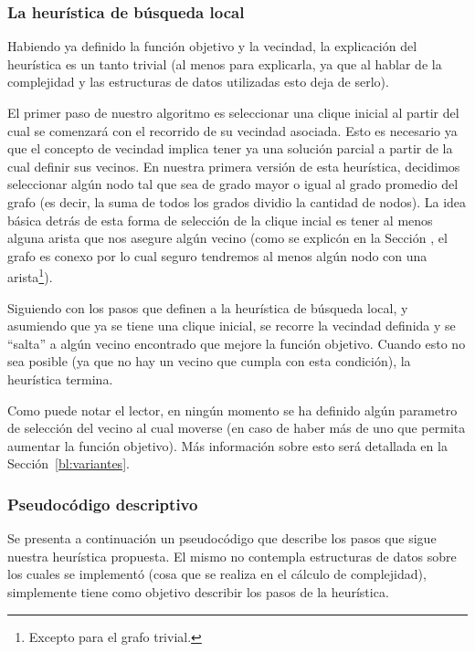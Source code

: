 \subsubsection{La heur\'istica de b\'usqueda local}
\par Habiendo ya definido la funci\'on objetivo y la vecindad, la explicaci\'on
    del heur\'istica es un tanto trivial (al menos para explicarla, ya que al
    hablar de la complejidad y las estructuras de datos utilizadas esto deja
    de serlo).

\par El primer paso de nuestro algoritmo es seleccionar una clique inicial
    al partir del cual se comenzar\'a con el recorrido de su vecindad asociada.
    Esto es necesario ya que el concepto de vecindad implica tener ya una
    soluci\'on parcial a partir de la cual definir sus vecinos. En nuestra
    primera versi\'on de esta heur\'istica, decidimos seleccionar alg\'un
    nodo tal que sea de grado mayor o igual al grado promedio del grafo (es
    decir, la suma de todos los grados dividio la cantidad de nodos). La
    idea b\'asica detr\'as de esta forma de selecci\'on de la clique incial
    es tener al menos alguna arista que nos asegure alg\'un vecino (como se
    explic\'on en la Secci\'on \emph{},
    \emph{} el grafo es conexo por lo cual seguro tendremos
    al menos alg\'un nodo con una arista\footnote{Excepto para el grafo trivial.}).

\par Siguiendo con los pasos que definen a la heur\'istica de b\'usqueda local,
    y asumiendo que ya se tiene una clique inicial, se recorre la vecindad
    definida y se ``salta'' a alg\'un vecino encontrado que mejore la
    funci\'on objetivo. Cuando esto no sea posible (ya que no hay un vecino
    que cumpla con esta condici\'on), la heur\'istica termina.

\par Como puede notar el lector, en ning\'un momento se ha definido alg\'un
    parametro de selecci\'on del vecino al cual moverse (en caso de haber
    m\'as de uno que permita aumentar la funci\'on objetivo). M\'as informaci\'on
    sobre esto ser\'a detallada en la Secci\'on~\ref{bl:variantes}.

\subsubsection{Pseudoc\'odigo descriptivo}
\par Se presenta a continuaci\'on un pseudoc\'odigo que describe los pasos que sigue
    nuestra heur\'istica propuesta. El mismo no contempla estructuras de datos sobre
    los cuales se implement\'o (cosa que se realiza en el c\'alculo de complejidad),
    simplemente tiene como objetivo describir los pasos de la heur\'istica.

